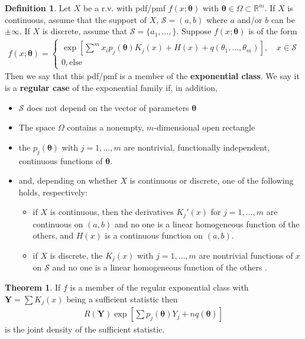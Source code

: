 \documentclass{book}
\theoremstyle{definition}
\newtheorem{defn}{Definition}[section]
\newtheorem{thm}{Theorem}[section]
\newcommand{\Else}{\text{else}}
\newcommand{\lb}{\left[}
\newcommand{\rb}{\right]}
\begin{document}
\begin{defn}
	Let $X$ be a r.v. with pdf/pmf $f(x;\bm\theta)$ with $\bm\theta \in \Omega \subset \mathbb{R}^m$. If $X$ is continuous, assume that the support of $X$, $\mathcal{S} = (a,b)$ where $a$ and/or $b$ can be $\pm \infty$. If $X$ is discrete, assume that $\mathcal{S} = \{a_1,\dots, \}$. Suppose $f(x;\bm\theta)$ is of the form
	\begin{align}
	f(x;\bm\theta) = \begin{cases}
	\exp\lb \sum^m x_i p_j(\bm\theta)K_j(x) + H(x) + q(\theta_1,\dots, \theta_m) \rb, \quad x \in \mathcal{S}\\
	0, \Else
	\end{cases}
	\end{align} 
	Then we say that this pdf/pmf is a member of the \textbf{exponential class}. We say it is a \textbf{regular case} of the exponential family if, in addition, 
	\begin{itemize}
		\item $\mathcal{S}$ does not depend on the vector of parameters $\bm\theta$
		
		\item The space $\Omega$ contains a nonempty, $m$-dimensional open rectangle 
		
		\item the $p_j(\bm\theta)$ with $j=1,\dots,m$ are nontrivial, functionally independent, continuous functions of $\bm\theta$.
		
		\item and, depending on whether $X$ is continuous or discrete, one of the following holds, respectively:
		\begin{itemize}
			\item if $X$ is continuous, then the derivatives $K_j'(x)$ for $j=1,\dots,m $ are continuous on $(a,b)$ and no one is a linear homogeneous function of the others, and $H(x)$ is a continuous function on $(a,b)$.
			
			
			
			\item if $X$ is discrete, the $K_j(x)$ with $j=1,\dots,m$ are nontrivial functions of $x$ on $\mathcal{S}$ and no one is a  linear homogeneous function of the others . 
		\end{itemize}
	\end{itemize}
\end{defn}


\begin{thm}
	If $f$ is a member of the regular exponential class with $\bm Y = \sum K_j(x)$ being a sufficient statistic  then
	\begin{align}
	R(\bm Y) \exp\lb \sum p_j(\bm\theta)Y_j + nq(\bm\theta) \rb
	\end{align}
	is the joint density of the sufficient statistic. 
\end{thm}
\end{document}
